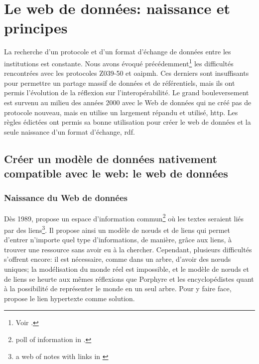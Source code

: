 \section{\label{II-A-1}Le web de données: naissance et principes}

La recherche d'un protocole et d'un format d'échange de données entre les institutions est constante. Nous avons évoqué précédemment\footnote{Voir .} les difficultés rencontrées avec les protocoles Z039-50 et \ac{oaipmh}. Ces derniers sont insuffisants pour permettre un partage massif de données et de référentiels, mais ils ont permis l'évolution de la réflexion sur l'interopérabilité. Le grand bouleversement est survenu au milieu des années 2000 avec le Web de données qui ne créé pas de protocole nouveau, mais en utilise un largement répandu et utilisé, \ac{http}. Les règles édictées ont permis sa bonne utilisation pour créer le web de données et la seule naissance d'un format d'échange, \ac{rdf}.

\subsection{\label{II-A-1-a}Créer un modèle de données nativement compatible avec le web: le web de données}

\subsubsection{\label{II-A-1-a-i}Naissance du Web de données}

Dès 1989,  propose un \og espace d'information commun\fg{}\footnote{\og poll of information\fg{} in \cite{berners-lee_information_1989}.} où les textes seraient liés par des liens\footnote{\og a web of notes with links\fg{} in \cite{berners-lee_information_1989}}. Il propose ainsi un modèle de nœuds et de liens qui permet d'entrer n'importe quel type d'informations, de manière, grâce aux liens, à trouver une ressource sans avoir eu à la chercher. Cependant, plusieurs difficultés s'offrent encore: il est nécessaire, comme dans un arbre, d'avoir des nœuds uniques; la modélisation du monde réel est impossible, et le modèle de nœuds et de liens se heurte aux mêmes réflexions que Porphyre et les encyclopédistes quant à la possibilité de représenter le monde en un seul arbre. Pour y faire face,  propose le lien hypertexte comme solution.\\


